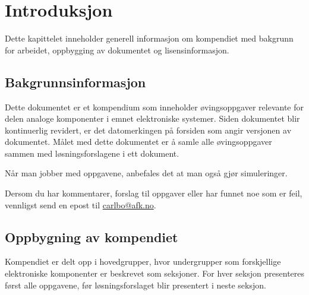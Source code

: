 \chapter{Introduksjon}
\label{ch:introduksjon}
Dette kapittelet inneholder generell informasjon om kompendiet med bakgrunn for arbeidet, oppbygging av dokumentet og lisensinformasjon.

\section{Bakgrunnsinformasjon}
Dette dokumentet er et kompendium som inneholder øvingsoppgaver relevante for delen analoge komponenter i emnet elektroniske systemer. Siden dokumentet blir kontinuerlig revidert, er det datomerkingen på forsiden som angir versjonen av dokumentet. Målet med dette dokumentet er å samle alle øvingsoppgaver sammen med løsningsforslagene i ett dokument.

Når man jobber med oppgavene, anbefales det at man også gjør simuleringer. %

Dersom du har kommentarer, forslag til oppgaver eller har funnet noe som er feil, vennligst send en epost til \href{mailto:carlbo@afk.no}{carlbo@afk.no}.

\section{Oppbygning av kompendiet}
Kompendiet er delt opp i hovedgrupper, hvor undergrupper som forskjellige elektroniske komponenter er beskrevet som seksjoner. For hver seksjon presenteres først alle oppgavene, før løsningsforslaget blir presentert i neste seksjon.

\begin{comment}
	\section{Lisensinformasjon}
	Dette dokumentet er basert på materiale fra \textit{Lessons In Electric Circuits} av Tony R. Kuphaldt, distribuert under Design Science License. Originaldokumentet kan finnes på \href{https://www.ibiblio.org/kuphaldt/electricCircuits/}{Lessons In Electric Circuits}. Eventuelle modifikasjoner og avledede verk er også distribuert under Design Science License.
	
	Deler av dette kompendiet er utviklet av Carl Magnus Bøe. Disse delene inkluderer:
	\begin{enumerate}[label=\roman*)]
		\item Kapittel \ref{sec:diodeOppgave} / \ref{sec:diodeLøsning}
		\item 
	\end{enumerate}
\end{comment}